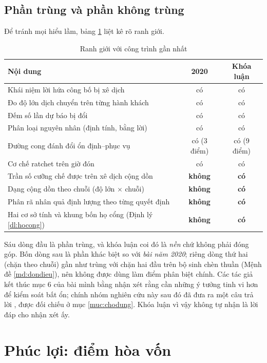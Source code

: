 \subsection{Phần trùng và phần không trùng}

Để tránh mọi hiểu lầm, bảng \ref{bang:trung} liệt kê rõ ranh giới.

\begin{table}[htbp]
\centering
\caption{Ranh giới với công trình gần nhất}
\label{bang:trung}
\small
\begin{tabular}{@{}p{7.2cm}cc@{}}
\toprule
\textbf{Nội dung} & \textbf{2020} & \textbf{Khóa luận}\\
\midrule
Khái niệm lời hứa công bố bị xê dịch & có & có\\
Đo độ lớn dịch chuyển trên từng hành khách & có & có\\
Đếm số lần dự báo bị đổi & có & có\\
Phân loại nguyên nhân (định tính, bằng lời) & có & có\\
Đường cong đánh đổi ổn định--phục vụ & có (3 điểm) & có (9 điểm)\\
Cơ chế ratchet trên giờ đón & có & có\\
\midrule
Trần số cưỡng chế được trên xê dịch cộng dồn & \textbf{không} & \textbf{có}\\
Dạng cộng dồn theo chuỗi (độ lớn $\times$ chuỗi) & \textbf{không} & \textbf{có}\\
Phân rã nhân quả định lượng theo từng quyết định & \textbf{không} & \textbf{có}\\
Hai cơ sở tính và khung bốn họ cổng (Định lý \ref{dl:hocong}) & \textbf{không} & \textbf{có}\\
\bottomrule
\end{tabular}
\end{table}

Sáu dòng đầu là phần trùng, và khóa luận coi đó là \emph{nền} chứ không phải đóng góp. Bốn dòng
sau là phần khác biệt so với \emph{bài năm 2020}; riêng dòng thứ hai (chặn theo chuỗi) gần như
trùng với chặn hai đầu trên bộ sinh chèn thuần (Mệnh đề \ref{md:dondieu}), nên không được dùng
làm điểm phân biệt chính. Các tác giả kết thúc mục 6 của bài mình bằng nhận xét rằng cần những ý
tưởng tinh vi hơn để kiểm soát bất ổn; chính nhóm nghiên cứu này sau đó đã đưa ra một câu trả lời
\cite{elmi2026}, được đối chiếu ở mục \ref{muc:chodung}. Khóa luận vì vậy không tự nhận là lời đáp
cho nhận xét ấy.

\section{Phúc lợi: điểm hòa vốn}
\label{muc:phucloi}

